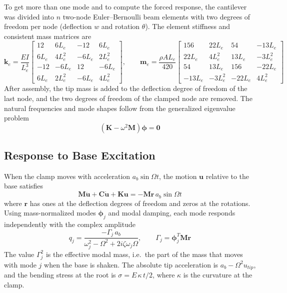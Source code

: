 \documentclass[letterpaper,10pt]{article}
\begin{document}
To get more than one mode and to compute the forced response, the cantilever was
divided into $n$ two-node Euler--Bernoulli beam elements with two degrees of freedom
per node (deflection $w$ and rotation $\theta$). The element stiffness and
consistent mass matrices are~\cite{logan}
\begin{equation}
\mathbf{k}_e = \frac{EI}{L_e^3}
\begin{bmatrix}
 12 & 6L_e & -12 & 6L_e \\
 6L_e & 4L_e^2 & -6L_e & 2L_e^2 \\
 -12 & -6L_e & 12 & -6L_e \\
 6L_e & 2L_e^2 & -6L_e & 4L_e^2
\end{bmatrix},
\qquad
\mathbf{m}_e = \frac{\rho A L_e}{420}
\begin{bmatrix}
 156 & 22L_e & 54 & -13L_e \\
 22L_e & 4L_e^2 & 13L_e & -3L_e^2 \\
 54 & 13L_e & 156 & -22L_e \\
 -13L_e & -3L_e^2 & -22L_e & 4L_e^2
\end{bmatrix}
\end{equation}
After assembly, the tip mass is added to the deflection degree of freedom of the last
node, and the two degrees of freedom of the clamped node are removed. The natural
frequencies and mode shapes follow from the generalized eigenvalue problem
\begin{equation}
  \left(\mathbf{K} - \omega^2 \mathbf{M}\right)\boldsymbol{\phi} = \mathbf{0}
\end{equation}

\subsection{Response to Base Excitation}

When the clamp moves with acceleration $a_b \sin\Omega t$, the motion $\mathbf{u}$
relative to the base satisfies
\begin{equation}
  \mathbf{M}\ddot{\mathbf{u}} + \mathbf{C}\dot{\mathbf{u}} + \mathbf{K}\mathbf{u}
  = -\mathbf{M}\mathbf{r}\,a_b \sin\Omega t
\end{equation}
where $\mathbf{r}$ has ones at the deflection degrees of freedom and zeros at the
rotations. Using mass-normalized modes $\boldsymbol{\phi}_j$ and modal damping, each
mode responds independently with the complex amplitude~\cite{rao,ecss}
\begin{equation}
  q_j = \frac{-\Gamma_j\, a_b}{\omega_j^2 - \Omega^2 + 2i\zeta\omega_j\Omega},
  \qquad \Gamma_j = \boldsymbol{\phi}_j^T \mathbf{M}\mathbf{r}
\end{equation}
The value $\Gamma_j^2$ is the effective modal mass, i.e.\ the part of the mass that
moves with mode $j$ when the base is shaken. The absolute tip acceleration is
$a_b - \Omega^2 u_{tip}$, and the bending stress at the root is
$\sigma = E\,\kappa\,t/2$, where $\kappa$ is the curvature at the clamp.
\end{document}
